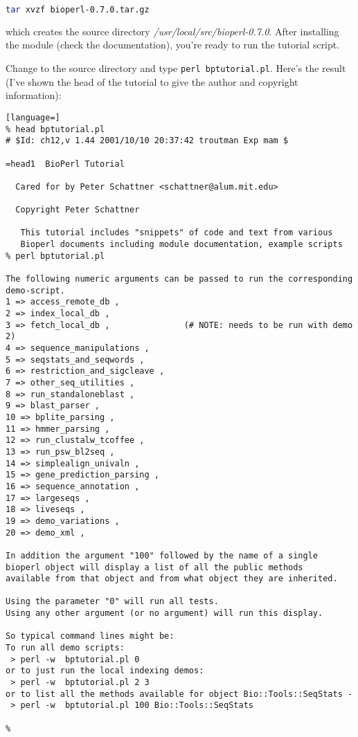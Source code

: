 \begin{lstlisting}[language=bash]
tar xvzf bioperl-0.7.0.tar.gz
\end{lstlisting}

which creates the source directory \textit{/usr/local/src/bioperl-0.7.0}. After installing the module (check the documentation), you're ready to run the tutorial script.

Change to the source directory and type \verb|perl bptutorial.pl|. Here's the result (I've shown the head of the tutorial to give the author and copyright information): 

\begin{lstlisting}[language=]
% head bptutorial.pl 
# $Id: ch12,v 1.44 2001/10/10 20:37:42 troutman Exp mam $

=head1  BioPerl Tutorial

  Cared for by Peter Schattner <schattner@alum.mit.edu>

  Copyright Peter Schattner

   This tutorial includes "snippets" of code and text from various
   Bioperl documents including module documentation, example scripts
% perl bptutorial.pl 

The following numeric arguments can be passed to run the corresponding demo-script.
1 => access_remote_db ,
2 => index_local_db ,
3 => fetch_local_db ,               (# NOTE: needs to be run with demo 2)
4 => sequence_manipulations ,
5 => seqstats_and_seqwords ,
6 => restriction_and_sigcleave ,
7 => other_seq_utilities ,
8 => run_standaloneblast ,
9 => blast_parser ,
10 => bplite_parsing ,
11 => hmmer_parsing ,
12 => run_clustalw_tcoffee ,
13 => run_psw_bl2seq ,
14 => simplealign_univaln ,
15 => gene_prediction_parsing ,
16 => sequence_annotation ,
17 => largeseqs ,
18 => liveseqs ,
19 => demo_variations ,
20 => demo_xml ,

In addition the argument "100" followed by the name of a single
bioperl object will display a list of all the public methods
available from that object and from what object they are inherited.

Using the parameter "0" will run all tests.
Using any other argument (or no argument) will run this display.

So typical command lines might be:
To run all demo scripts:
 > perl -w  bptutorial.pl 0
or to just run the local indexing demos:
 > perl -w  bptutorial.pl 2 3
or to list all the methods available for object Bio::Tools::SeqStats -
 > perl -w  bptutorial.pl 100 Bio::Tools::SeqStats

%
\end{lstlisting}

